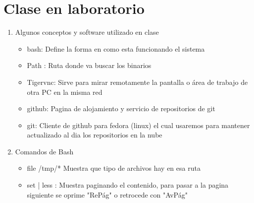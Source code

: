 \documentclass{book}
\begin{document}



\section{Clase en laboratorio}%
\begin{flushright}
	\date{08 de enero de 2019}
\end{flushright}

\begin{enumerate}%
	
	\item Algunos conceptos y software utilizado en clase%
	\begin{itemize}
		\item bash: Define la forma en como esta funcionando el sistema
		\item Path : Ruta donde va buscar los binarios
		\item Tigervnc: Sirve para mirar remotamente la pantalla o área de trabajo de otra PC en la misma red
		\item github: Pagina de alojamiento y servicio de repositorios de git
		\item git: Cliente de github para fedora (linux) el cual usaremos para mantener actualizado al dia los repositorios en la nube
		
	\end{itemize}
	
	\item Comandos de Bash%
	\begin{itemize}%
		\item file /tmp/* Muestra que tipo de archivos hay en esa ruta
		\item set | less : Muestra paginando el contenido, para pasar a la pagina siguiente se oprime "RePág" o retrocede con "AvPág"
		

\end{itemize}
\end{enumerate}
\end{document}
